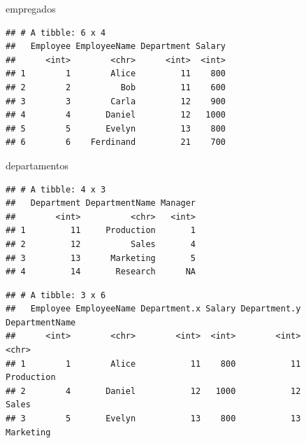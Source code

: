 \documentclass[]{book}
\newenvironment{Shaded}{\begin{snugshade}}{\end{snugshade}}
\newcommand{\KeywordTok}[1]{\textcolor[rgb]{0.13,0.29,0.53}{\textbf{#1}}}
\newcommand{\DataTypeTok}[1]{\textcolor[rgb]{0.13,0.29,0.53}{#1}}
\newcommand{\StringTok}[1]{\textcolor[rgb]{0.31,0.60,0.02}{#1}}
\newcommand{\OperatorTok}[1]{\textcolor[rgb]{0.81,0.36,0.00}{\textbf{#1}}}
\newcommand{\NormalTok}[1]{#1}
\begin{document}
\begin{Shaded}
\begin{Highlighting}[]
\NormalTok{empregados}
\end{Highlighting}
\end{Shaded}

\begin{verbatim}
## # A tibble: 6 x 4
##   Employee EmployeeName Department Salary
##      <int>        <chr>      <int>  <int>
## 1        1        Alice         11    800
## 2        2          Bob         11    600
## 3        3        Carla         12    900
## 4        4       Daniel         12   1000
## 5        5       Evelyn         13    800
## 6        6    Ferdinand         21    700
\end{verbatim}

\begin{Shaded}
\begin{Highlighting}[]
\NormalTok{departamentos}
\end{Highlighting}
\end{Shaded}

\begin{verbatim}
## # A tibble: 4 x 3
##   Department DepartmentName Manager
##        <int>          <chr>   <int>
## 1         11     Production       1
## 2         12          Sales       4
## 3         13      Marketing       5
## 4         14       Research      NA
\end{verbatim}

\begin{Shaded}
\end{Shaded}

\begin{verbatim}
## # A tibble: 3 x 6
##   Employee EmployeeName Department.x Salary Department.y DepartmentName
##      <int>        <chr>        <int>  <int>        <int>          <chr>
## 1        1        Alice           11    800           11     Production
## 2        4       Daniel           12   1000           12          Sales
## 3        5       Evelyn           13    800           13      Marketing
\end{verbatim}
\end{document}
